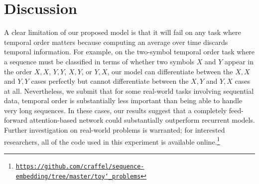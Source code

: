 \documentclass{article} %
\begin{document}
\section{Discussion}
\label{sec:limitations}

A clear limitation of our proposed model is that it will fail on any task where temporal order matters because computing an average over time discards temporal information.
For example, on the two-symbol temporal order task \cite{hochreiter1997long} where a sequence must be classified in terms of whether two symbols $X$ and $Y$ appear in the order $X, X$, $Y, Y$, $X, Y$, or $Y, X$, our model can differentiate between the $X, X$ and $Y, Y$ cases perfectly but cannot differentiate between the $X, Y$ and $Y, X$ cases at all.
Nevertheless, we submit that for some real-world tasks involving sequential data, temporal order is substantially less important than being able to handle very long sequences.
In these cases, our results suggest that a completely feed-forward attention-based network could substantially outperform recurrent models.
Further investigation on real-world problems is warranted; for interested researchers, all of the code used in this experiment is available online.\footnote{\href{https://github.com/craffel/sequence-embedding/tree/master/toy_problems}{\texttt{https://github.com/craffel/sequence-embedding/tree/master/toy\char`_problems}}}


\small

\end{document}
